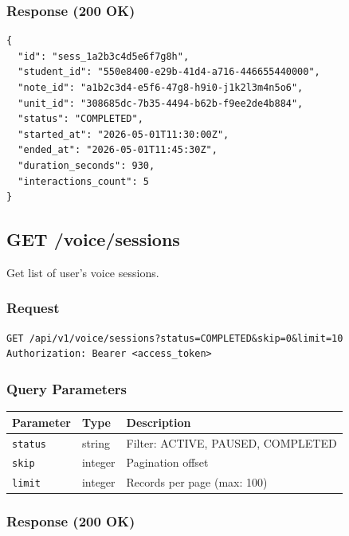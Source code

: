 \documentclass[12pt,a4paper,oneside]{article}
\begin{document}
\subsubsection{Response (200 OK)}

\begin{lstlisting}
{
  "id": "sess_1a2b3c4d5e6f7g8h",
  "student_id": "550e8400-e29b-41d4-a716-446655440000",
  "note_id": "a1b2c3d4-e5f6-47g8-h9i0-j1k2l3m4n5o6",
  "unit_id": "308685dc-7b35-4494-b62b-f9ee2de4b884",
  "status": "COMPLETED",
  "started_at": "2026-05-01T11:30:00Z",
  "ended_at": "2026-05-01T11:45:30Z",
  "duration_seconds": 930,
  "interactions_count": 5
}
\end{lstlisting}

\subsection{GET /voice/sessions}

Get list of user's voice sessions.

\subsubsection{Request}

\begin{lstlisting}
GET /api/v1/voice/sessions?status=COMPLETED&skip=0&limit=10
Authorization: Bearer <access_token>
\end{lstlisting}

\subsubsection{Query Parameters}

\begin{table}[H]
\centering
\small
\begin{tabular}{|l|l|l|}
\hline
\textbf{Parameter} & \textbf{Type} & \textbf{Description} \\
\hline
\texttt{status} & string & Filter: ACTIVE, PAUSED, COMPLETED \\
\hline
\texttt{skip} & integer & Pagination offset \\
\hline
\texttt{limit} & integer & Records per page (max: 100) \\
\hline
\end{tabular}
\end{table}

\subsubsection{Response (200 OK)}
\end{document}

